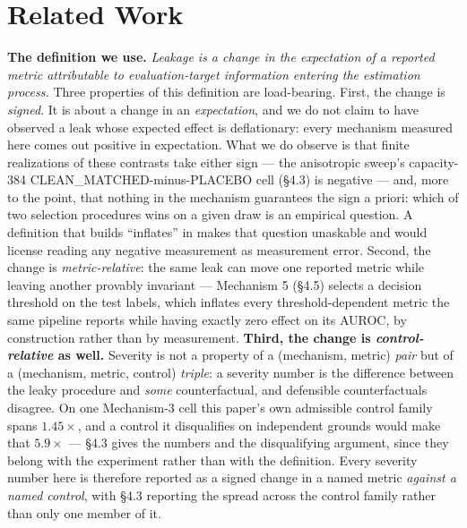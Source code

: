\documentclass[10pt]{article} %
\begin{document}
\section{Related Work}

\textbf{The definition we use.} \emph{Leakage is a change in the expectation of
a reported metric attributable to evaluation-target information entering the
estimation process.} Three properties of this definition are load-bearing.
First, the change is \emph{signed}. It is about a change in an
\emph{expectation}, and we do not claim to have observed a leak whose expected
effect is deflationary: every mechanism measured here comes out positive in
expectation. What we do observe is that finite realizations of these contrasts
take either sign --- the anisotropic sweep's capacity-384
CLEAN\_MATCHED-minus-PLACEBO cell (§4.3) is negative --- and, more to the point,
that nothing in the mechanism guarantees the sign a priori: which of two
selection procedures wins on a given draw is an empirical question. A
definition that builds ``inflates'' in makes that question unaskable and would
license reading any negative measurement as measurement error. Second, the
change is \emph{metric-relative}: the same leak can move one reported metric
while leaving another provably invariant --- Mechanism 5 (§4.5) selects a
decision threshold on the test labels, which inflates every threshold-dependent
metric the same pipeline reports while having exactly zero effect on its AUROC,
by construction rather than by measurement. \textbf{Third, the change is
\emph{control-relative} as well.} Severity is not a property of a (mechanism,
metric) \emph{pair} but of a (mechanism, metric, control) \emph{triple}: a
severity number is the difference between the leaky procedure and \emph{some}
counterfactual, and defensible counterfactuals disagree. On one Mechanism-3
cell this paper's own admissible control family spans $1.45\times$, and a
control it disqualifies on independent grounds would make that $5.9\times$ ---
§4.3 gives the numbers and the disqualifying argument, since they belong with
the experiment rather than with the definition. Every severity number here is
therefore reported as a signed change in a named metric \emph{against a named
control}, with §4.3 reporting the spread across the control family rather than
only one member of it.
\end{document}
